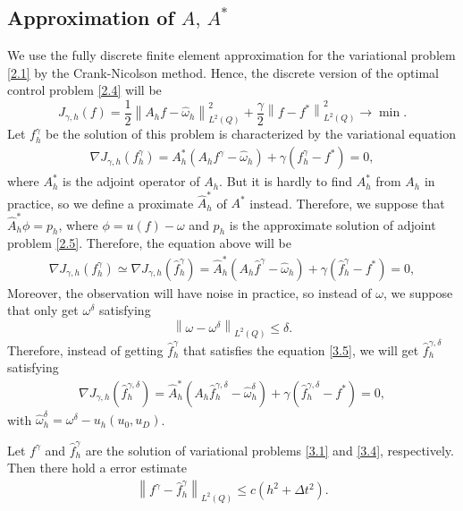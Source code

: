 \documentclass[notitlepage,a4paper,fleqn,9pt]{icmfarticle}
\begin{document}
\begin{multicols}{2}
\subsection{Approximation of $A,\, A^*$}
We use the fully discrete finite element approximation for the variational problem \eqref{2.1} by the Crank-Nicolson method. Hence, the discrete version of the optimal control problem \eqref{2.4} will be
$$J_{\gamma, h}(f)=\frac{1}{2}\left\|A_hf-\hat{\omega}_h\right\|^2_{L^2(Q)}+\frac{\gamma}{2}\left\|f-f^*\right\|^2_{L^2(Q)}\to \min.$$
Let $f^\gamma_h$ be the solution of this problem is characterized by the variational equation
\begin{align}\label{3.3}
\nabla J_{\gamma, h}(f^\gamma_h)= A_h^*(A_hf^\gamma-\hat{\omega}_h)+\gamma(f^\gamma_h-f^*)=0,
\end{align}
where $A_h^*$ is the adjoint operator of $A_h$. But it is hardly to find $A^*_h$ from $A_h$ in practice, so we define a proximate $\hat{A}_h^*$ of $A^*$ instead. Therefore, we suppose that $\hat{A}^*_h\phi=p_h$, where $\phi= u(f) - \omega$ and $p_h$ is the approximate solution of adjoint problem \eqref{2.5}. Therefore, the equation above will be
\begin{align}\label{3.4}
\nabla J_{\gamma, h}(f^\gamma_h)\simeq\nabla J_{\gamma, h}(\hat{f}^\gamma_h)= \hat{A}_h^*(A_h\hat{f}^\gamma-\hat{\omega}_h)+\gamma(\hat{f}^\gamma_h-f^*)=0,
\end{align}
Moreover, the observation will have noise in practice, so instead of $\omega$, we suppose that only get $\omega^{\delta}$ satisfying
$$\left\| \omega-\omega^\delta\right\|_{L^2(Q)}\leq \delta.$$
Therefore, instead of getting $\hat{f}^\gamma_h$ that satisfies the equation \eqref{3.5}, we will get $\hat{f}^{\gamma, \delta}_h$ satisfying
\begin{align}\label{3.5}
\nabla J_{\gamma, h}\left(\hat{f}^{\gamma, \delta}_h\right)= \hat{A}_h^*(A_h\hat{f}^{\gamma, \delta}_h-\hat{\omega}_h^\delta)+\gamma(\hat{f}^{\gamma, \delta}_h-f^*)=0,
\end{align}
with $\hat{\omega}_h^\delta=\omega^\delta- u_h(u_0, u_D)$.

\begin{dl}\label{dl3.3}
	Let $f^\gamma$ and $\hat{f}^\gamma_h$ are the solution of variational problems \eqref{3.1} and \eqref{3.4}, respectively. Then there hold a error estimate
	\begin{align}\label{3.11}
	\left\|f^\gamma-\hat{f}^\gamma_h \right\|_{L^2(Q)}\leq c(h^2+\Delta t^2).
	\end{align}
\end{dl}


\end{multicols}
\end{document}
